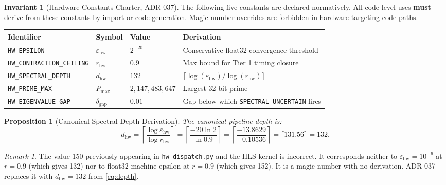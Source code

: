 \documentclass[12pt,letterpaper]{article}
\theoremstyle{plain}
\newtheorem{proposition}[theorem]{Proposition}
\theoremstyle{definition}
\newtheorem{invariant}[theorem]{Invariant}
\theoremstyle{remark}
\newtheorem{remark}[theorem]{Remark}
\begin{document}
\begin{invariant}[Hardware Constants Charter, ADR-037]\label{inv:constants}
The following five constants are declared normatively. All code-level uses
\textbf{must} derive from these constants by import or code generation.
Magic number overrides are forbidden in hardware-targeting code paths.

\begin{center}
\begin{tabular}{lllp{5cm}}
\toprule
\textbf{Identifier} & \textbf{Symbol} & \textbf{Value} & \textbf{Derivation} \\
\midrule
\texttt{HW\_EPSILON}             & \(\varepsilon_{\mathrm{hw}}\) & \(2^{-20}\)        & Conservative float32 convergence threshold \\
\texttt{HW\_CONTRACTION\_CEILING}& \(r_{\mathrm{hw}}\)           & \(0.9\)            & Max bound for Tier 1 timing closure \\
\texttt{HW\_SPECTRAL\_DEPTH}     & \(d_{\mathrm{hw}}\)           & \(132\)            & \(\lceil \log(\varepsilon_{\mathrm{hw}}) / \log(r_{\mathrm{hw}}) \rceil\) \\
\texttt{HW\_PRIME\_MAX}          & \(P_{\max}\)                  & \(2{,}147{,}483{,}647\) & Largest 32-bit prime \\
\texttt{HW\_EIGENVALUE\_GAP}     & \(\delta_{\mathrm{gap}}\)     & \(0.01\)           & Gap below which \texttt{SPECTRAL\_UNCERTAIN} fires \\
\bottomrule
\end{tabular}
\end{center}
\end{invariant}

\begin{proposition}[Canonical Spectral Depth Derivation]
The canonical pipeline depth is:
\begin{equation}
  d_{\mathrm{hw}} = \left\lceil \frac{\log \varepsilon_{\mathrm{hw}}}{\log r_{\mathrm{hw}}} \right\rceil
  = \left\lceil \frac{-20 \ln 2}{\ln 0.9} \right\rceil
  = \left\lceil \frac{-13.8629}{-0.10536} \right\rceil
  = \lceil 131.56 \rceil = 132. \label{eq:depth}
\end{equation}
\end{proposition}

\begin{remark}
The value 150 previously appearing in \texttt{hw\_dispatch.py} and the HLS
kernel is incorrect. It corresponds neither to \(\varepsilon_{\mathrm{hw}} = 10^{-6}\)
at \(r = 0.9\) (which gives 132) nor to float32 machine epsilon at \(r = 0.9\)
(which gives 152). It is a magic number with no derivation. ADR-037 replaces
it with \(d_{\mathrm{hw}} = 132\) from \cref{eq:depth}.
\end{remark}
\end{document}
